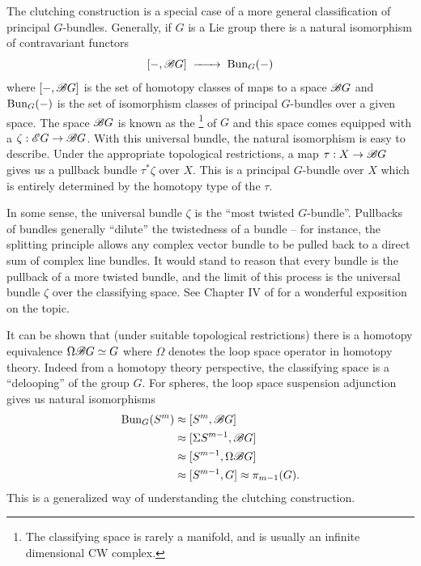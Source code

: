 \begin{remark}
	The clutching construction is a special case of a more general classification of principal $G$-bundles. Generally, if $G$ is a Lie group there is a natural isomorphism of contravariant functors
	\[
		[-, \Bclass G] \lkxto \Bun_G(-)
	\]
	where $[-, \mathscr{B} G]$ is the set of homotopy classes of maps to a space $\mathscr{B} G$ and $\operatorname{Bun}_G(-)$ is the set of isomorphism classes of principal $G$-bundles over a given space.
	The space $\mathscr{B} G$ is known as the \footnote{The classifying space is rarely a manifold, and is usually an infinite dimensional CW complex.} of $G$ and this space comes equipped with a  $\zeta : \mathscr{E} G \to \mathscr{B} G$. With this universal bundle, the natural isomorphism is easy to describe. Under the appropriate topological restrictions, a map $\tau : X \to \mathscr{B} G$ gives us a pullback bundle $\tau^*\zeta$ over $X$. This is a principal $G$-bundle over $X$ which is entirely determined by the homotopy type of the  $\tau$.

	In some sense, the universal bundle $\zeta$ is the ``most twisted $G$-bundle''. Pullbacks of bundles generally ``dilute'' the twistedness of a bundle -- for instance, the splitting principle allows any complex vector bundle to be pulled back to a direct sum of complex line bundles. It would stand to reason that every bundle is the pullback of a more twisted bundle, and the limit of this process is the universal bundle $\zeta$ over the classifying space. See Chapter IV of \cite{botttu1982differential} for a wonderful exposition on the topic.

	It can be shown that (under suitable topological restrictions) there is a homotopy equivalence $\Omega \mathscr{B} G \simeq G$ where $\Omega$ denotes the loop space operator in homotopy theory. Indeed from a homotopy theory perspective, the classifying space is a ``delooping'' of the group $G$. For spheres, the loop space suspension adjunction gives us natural isomorphisms
	\[
		\begin{aligned}
			\operatorname{Bun}_{G}(S^m) & \approx [S^m, \mathscr{B} G]            \\
			              & \approx [\Sigma S^{m-1}, \mathscr{B} G] \\
			              & \approx [S^{m-1}, \Omega\mathscr{B} G]  \\
			              & \approx [S^{m-1}, G]
			\approx \pi_{m-1}(G).
		\end{aligned}
	\]
	This is a generalized way of understanding the clutching construction.
\end{remark}

